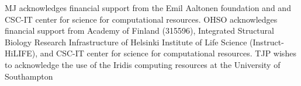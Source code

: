 \documentclass[aps,prl,superscriptaddress,twocolumn]{revtex4}
\begin{document}
\begin{acknowledgments}
  MJ acknowledges financial support from the Emil Aaltonen foundation and
  and CSC-IT center for science for computational resources.
  OHSO acknowledges financial support from Academy of Finland (315596),
  Integrated Structural Biology Research Infrastructure of
  Helsinki Institute of Life Science (Instruct-HiLIFE), and
  CSC-IT center for science for computational resources.
  TJP wishes to acknowledge the use of the Iridis computing resources at the University of Southampton
\end{acknowledgments}

\newpage





\listoftodos
\end{document}
